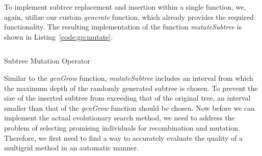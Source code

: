 To implement subtree replacement and insertion within a single function, we, again, utilize our custom \emph{generate} function, which already provides the required functionality.
The resulting implementation of the function \emph{mutateSubtree} is shown in Listing~\ref{code:gp:mutate}.
\begin{listing}[ht]
	\inputminted{python}{evostencils/gp/mutate.py}
	\caption{Subtree Mutation Operator}
	\label{code:gp:mutate}
\end{listing}
Similar to the \emph{genGrow} function, \emph{mutateSubtree} includes an interval from which the maximum depth of the randomly generated subtree is chosen.
To prevent the size of the inserted subtree from exceeding that of the original tree, an interval smaller than that of the \emph{genGrow} function should be chosen.
Now before we can implement the actual evolutionary search method, we need to address the problem of selecting promising individuals for recombination and mutation.
Therefore, we first need to find a way to accurately evaluate the quality of a multigrid method in an automatic manner.

